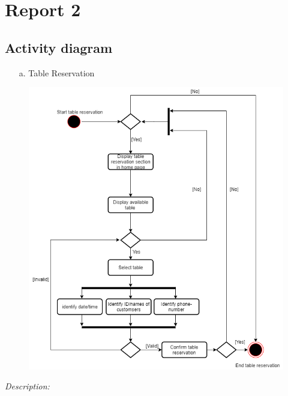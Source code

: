 \documentclass[11pt]{article}
\begin{document}
\section{Report 2}
    \subsection{Activity diagram}
        \begin{enumerate}
            \item[a. ] Table Reservation
        \end{enumerate}
            \begin{figure}[!h]
                \centering
                \includegraphics[scale=0.58]{Activity diagram/TableReservation.png}
            \end{figure}
            \textit{Description:}
\end{document}
